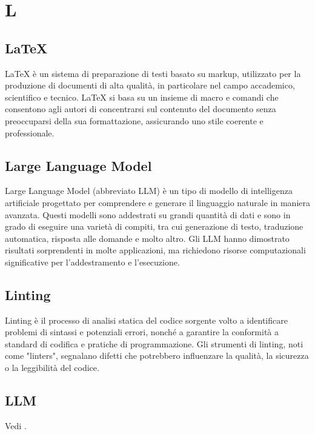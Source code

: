 \section{L}

\vspace{2em}
\subsection*{LaTeX}
\par LaTeX è un sistema di preparazione di testi basato su markup, utilizzato per la produzione di documenti di alta qualità, in particolare nel campo accademico, scientifico e tecnico. LaTeX si basa su un insieme di macro e comandi che consentono agli autori di concentrarsi sul contenuto del documento senza preoccuparsi della sua formattazione, assicurando uno stile coerente e professionale.

\vspace{2em}
\subsection*{Large Language Model}
\par Large Language Model (abbreviato LLM) è un tipo di modello di intelligenza artificiale progettato per comprendere e generare il linguaggio naturale in maniera avanzata. Questi modelli sono addestrati su grandi quantità di dati e sono in grado di eseguire una varietà di compiti, tra cui generazione di testo, traduzione automatica, risposta alle domande e molto altro. Gli LLM hanno dimostrato risultati sorprendenti in molte applicazioni, ma richiedono risorse computazionali significative per l'addestramento e l'esecuzione.

\vspace{2em}
\subsection*{Linting}
\par Linting è il processo di analisi statica del codice sorgente volto a identificare problemi di sintassi e potenziali errori, nonché a garantire la conformità a standard di codifica e pratiche di programmazione. Gli strumenti di linting, noti come "linters", segnalano difetti che potrebbero influenzare la qualità, la sicurezza o la leggibilità del codice.

\vspace{2em}
\subsection*{LLM}
\par Vedi .

